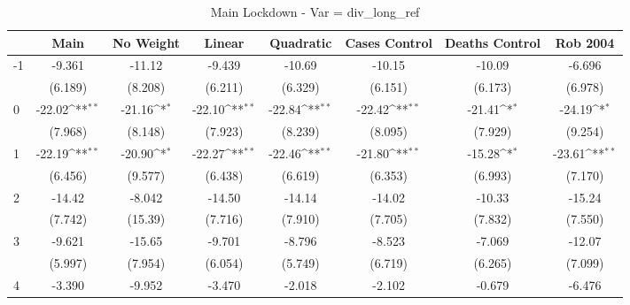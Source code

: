 \documentclass{article}
\begin{document}
{
\def\sym#1{\ifmmode^{#1}\else\(^{#1}\)\fi}
\begin{longtable}{l*{7}{c}}
\caption{Main Lockdown - Var = div\_long\_ref}\\
\hline\hline\endfirsthead\hline\endhead\hline\endfoot\endlastfoot
                &\multicolumn{1}{c}{Main}&\multicolumn{1}{c}{No Weight}&\multicolumn{1}{c}{Linear}&\multicolumn{1}{c}{Quadratic}&\multicolumn{1}{c}{Cases Control}&\multicolumn{1}{c}{Deaths Control}&\multicolumn{1}{c}{Rob 2004}\\
\hline
-1              &   -9.361         &   -11.12         &   -9.439         &   -10.69         &   -10.15         &   -10.09         &   -6.696         \\
                &  (6.189)         &  (8.208)         &  (6.211)         &  (6.329)         &  (6.151)         &  (6.173)         &  (6.978)         \\
0               &   -22.02\sym{**} &   -21.16\sym{*}  &   -22.10\sym{**} &   -22.84\sym{**} &   -22.42\sym{**} &   -21.41\sym{*}  &   -24.19\sym{*}  \\
                &  (7.968)         &  (8.148)         &  (7.923)         &  (8.239)         &  (8.095)         &  (7.929)         &  (9.254)         \\
1               &   -22.19\sym{**} &   -20.90\sym{*}  &   -22.27\sym{**} &   -22.46\sym{**} &   -21.80\sym{**} &   -15.28\sym{*}  &   -23.61\sym{**} \\
                &  (6.456)         &  (9.577)         &  (6.438)         &  (6.619)         &  (6.353)         &  (6.993)         &  (7.170)         \\
2               &   -14.42         &   -8.042         &   -14.50         &   -14.14         &   -14.02         &   -10.33         &   -15.24         \\
                &  (7.742)         &  (15.39)         &  (7.716)         &  (7.910)         &  (7.705)         &  (7.832)         &  (7.550)         \\
3               &   -9.621         &   -15.65         &   -9.701         &   -8.796         &   -8.523         &   -7.069         &   -12.07         \\
                &  (5.997)         &  (7.954)         &  (6.054)         &  (5.749)         &  (6.719)         &  (6.265)         &  (7.099)         \\
4               &   -3.390         &   -9.952         &   -3.470         &   -2.018         &   -2.102         &   -0.679         &   -6.476         \\

\end{longtable}}
\end{document}
